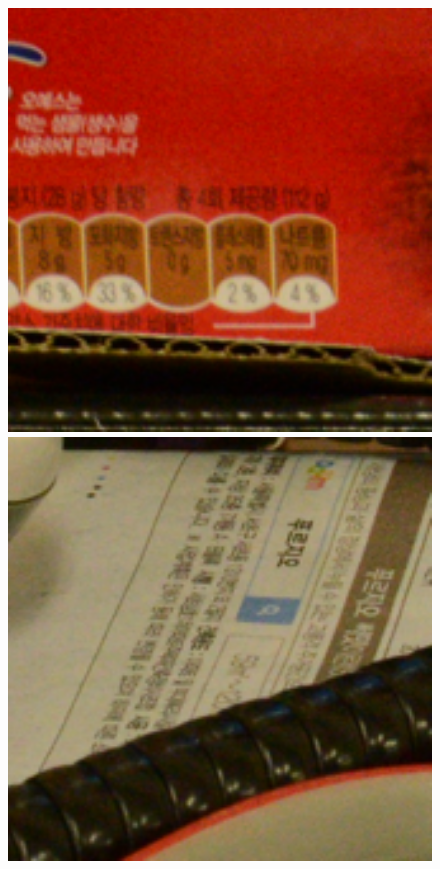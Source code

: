 \documentclass[10pt,twocolumn,letterpaper]{article}
\begin{document}
\begin{figure}[t]
{\begin{minipage}{0.055\textwidth}
\end{minipage}
\begin{minipage}{0.055\textwidth}
\includegraphics[width=1\textwidth]{images/resize_CC_Noisy_Nikon_D800_ISO_3200_A1_21.png}
\end{minipage}
\begin{minipage}{0.055\textwidth}
\includegraphics[width=1\textwidth]{images/resize_CC_Noisy_Nikon_D800_ISO_3200_A1_111.png}

\end{minipage}}
\end{figure}
\end{document}
